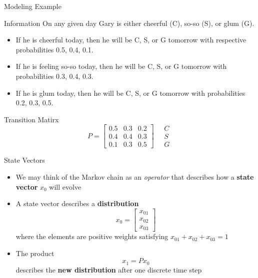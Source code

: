 \documentclass[10pt]{beamer}
\begin{document}
\begin{frame}{Modeling Example}

\begin{block}{Information }    
On any given day Gary is either cheerful (C), so-so (S), or glum (G). 
\begin{itemize}
    \item If he is cheerful today, then he will be C, S, or G tomorrow with respective probabilities 0.5, 0.4, 0.1. 
    \item If he is feeling so-so today, then he will be C, S, or G tomorrow with probabilities 0.3, 0.4, 0.3. 
    \item If he is glum today, then he will be C, S, or G tomorrow with probabilities 0.2, 0.3, 0.5.
\end{itemize}
\end{block}

\begin{block}{Transition Matirx}
    $$
    P = \begin{bmatrix}
        0.5 & 0.3 & 0.2\\
        0.4 & 0.4 & 0.3\\
        0.1 & 0.3 & 0.5
    \end{bmatrix}\quad
    \begin{array}{c}
         C\\ S\\G
    \end{array}
    $$
\end{block}


\end{frame}


\begin{frame}{State Vectors}

\begin{itemize}
    \item We may think of the Markov chain as an \textit{operator} that describes how a \textbf{state vector}  $x_0$ will evolve 
    \vfill

    \item A state vector describes a \textbf{distribution}
    $$x_0=\begin{bmatrix}
        x_{01}\\
        x_{02}\\
        x_{03}
    \end{bmatrix}$$
    where the elements are positive weights satisfying $x_{01}+ x_{02} + x_{03}=1$   
    \vfill

    \item The product 
    $$ x_1 = P x_0$$
    describes the \textbf{new distribution} after one discrete time step
\end{itemize}
    
\end{frame}
\end{document}
